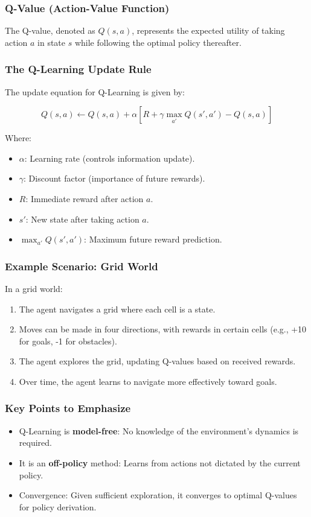 \documentclass[aspectratio=169]{beamer}
\begin{document}
\begin{frame}[fragile]
    \frametitle{Q-Value (Action-Value Function)}
    The Q-value, denoted as \( Q(s, a) \), represents the expected utility of taking action \( a \) in state \( s \) while following the optimal policy thereafter.
\end{frame}

\begin{frame}[fragile]
    \frametitle{The Q-Learning Update Rule}
    The update equation for Q-Learning is given by:

    \begin{equation} 
    Q(s, a) \leftarrow Q(s, a) + \alpha \left[ R + \gamma \max_{a'} Q(s', a') - Q(s, a) \right]
    \end{equation}

    Where:
    \begin{itemize}
        \item \( \alpha \): Learning rate (controls information update).
        \item \( \gamma \): Discount factor (importance of future rewards).
        \item \( R \): Immediate reward after action \( a \).
        \item \( s' \): New state after taking action \( a \).
        \item \( \max_{a'} Q(s', a') \): Maximum future reward prediction.
    \end{itemize}
\end{frame}

\begin{frame}[fragile]
    \frametitle{Example Scenario: Grid World}
    In a grid world:
    \begin{enumerate}
        \item The agent navigates a grid where each cell is a state.
        \item Moves can be made in four directions, with rewards in certain cells (e.g., +10 for goals, -1 for obstacles).
        \item The agent explores the grid, updating Q-values based on received rewards.
        \item Over time, the agent learns to navigate more effectively toward goals.
    \end{enumerate}
\end{frame}

\begin{frame}[fragile]
    \frametitle{Key Points to Emphasize}
    \begin{itemize}
        \item Q-Learning is \textbf{model-free}: No knowledge of the environment's dynamics is required.
        \item It is an \textbf{off-policy} method: Learns from actions not dictated by the current policy.
        \item Convergence: Given sufficient exploration, it converges to optimal Q-values for policy derivation.
    \end{itemize}
\end{frame}
\end{document}
